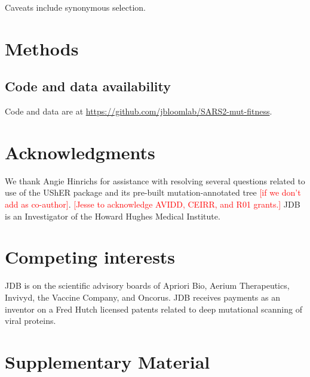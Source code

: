 \documentclass[9pt,twocolumn,twoside]{gsajnl_modified}
\newcommand\jdbcomment[1]{\textcolor{red}{[#1]}}
\begin{document}
Caveats include synonymous selection.

{\small

\section{Methods}
\subsection{Code and data availability}
Code and data are at \url{https://github.com/jbloomlab/SARS2-mut-fitness}.

\section{Acknowledgments}
We thank Angie Hinrichs for assistance with resolving several questions related to use of the UShER package and its pre-built mutation-annotated tree \jdbcomment{if we don't add as co-author}.
\jdbcomment{Jesse to acknowledge AVIDD, CEIRR, and R01 grants.}
JDB is an Investigator of the Howard Hughes Medical Institute.

\section{Competing interests}
JDB is on the scientific advisory boards of Apriori Bio, Aerium Therapeutics, Invivyd, the Vaccine Company, and Oncorus.
JDB receives payments as an inventor on a Fred Hutch licensed patents related to deep mutational scanning of viral proteins.


}

\onecolumn
\renewcommand{\thepage}{S\arabic{page}}
\setcounter{page}{1}
\renewcommand{\thefigure}{S\arabic{figure}}
\setcounter{figure}{0}

\clearpage

\section{Supplementary Material}
\end{document}
